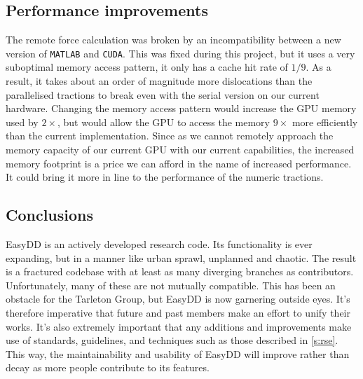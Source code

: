 \subsection{Performance improvements}

The remote force calculation was broken by an incompatibility between a new version of \texttt{MATLAB} and \texttt{CUDA}. This was fixed during this project, but it uses a very suboptimal memory access pattern, it only has a cache hit rate of $1/9$. As a result, it takes about an order of magnitude more dislocations than the parallelised tractions to break even with the serial version on our current hardware. Changing the memory access pattern would increase the GPU memory used by $2\times$, but would allow the GPU to access the memory $9\times$ more efficiently than the current implementation. Since as we cannot remotely approach the memory capacity of our current GPU with our current capabilities, the increased memory footprint is a price we can afford in the name of increased performance. It could bring it more in line to the performance of the numeric tractions.

\subsection{Conclusions}

EasyDD is an actively developed research code. Its functionality is ever expanding, but in a manner like urban sprawl, unplanned and chaotic. The result is a fractured codebase with at least as many diverging branches as contributors. Unfortunately, many of these are not mutually compatible. This has been an obstacle for the Tarleton Group, but EasyDD is now garnering outside eyes. It's therefore imperative that future and past members make an effort to unify their works. It's also extremely important that any additions and improvements make use of standards, guidelines, and techniques such as those described in \cref{s:rse}. This way, the maintainability and usability of EasyDD will improve rather than decay as more people contribute to its features.
\savearabiccounter
